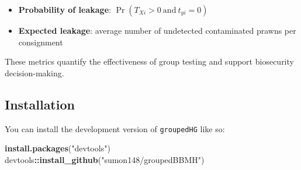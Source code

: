 \documentclass[
]{article}
\newenvironment{Shaded}{\begin{snugshade}}{\end{snugshade}}
\newcommand{\FunctionTok}[1]{\textcolor[rgb]{0.13,0.29,0.53}{\textbf{#1}}}
\newcommand{\NormalTok}[1]{#1}
\newcommand{\SpecialCharTok}[1]{\textcolor[rgb]{0.81,0.36,0.00}{\textbf{#1}}}
\newcommand{\StringTok}[1]{\textcolor[rgb]{0.31,0.60,0.02}{#1}}
\providecommand{\tightlist}{%
  \setlength{\itemsep}{0pt}\setlength{\parskip}{0pt}}
\begin{document}
\begin{itemize}
\tightlist
\item
  \textbf{Probability of leakage}:
  \(\Pr(T_{Xi} > 0 \ \text{and} \ t_{yi} = 0)\)
\item
  \textbf{Expected leakage}: average number of undetected contaminated
  prawns per consignment
\end{itemize}

These metrics quantify the effectiveness of group testing and support
biosecurity decision-making.

\subsection{Installation}\label{installation}

You can install the development version of \texttt{groupedHG} like so:

\begin{Shaded}
\begin{Highlighting}[]
\FunctionTok{install.packages}\NormalTok{(}\StringTok{"devtools"}\NormalTok{)}
\NormalTok{devtools}\SpecialCharTok{::}\FunctionTok{install\_github}\NormalTok{(}\StringTok{"sumon148/groupedBBMH"}\NormalTok{)}
\end{Highlighting}
\end{Shaded}
\end{document}
